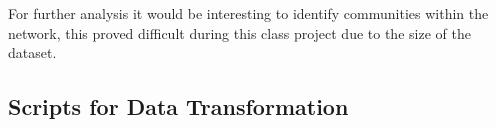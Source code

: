 \documentclass{article}\usepackage[]{graphicx}\usepackage[]{color}
\begin{document}
For further analysis it would be interesting to identify communities within the network, this proved difficult during this class project due to the size of the dataset. 




\newpage 
\printbibliography

\newpage 
\begin{appendices}
  \section{Scripts for Data Transformation}
  
  
  
  
\end{appendices}
\end{document}
